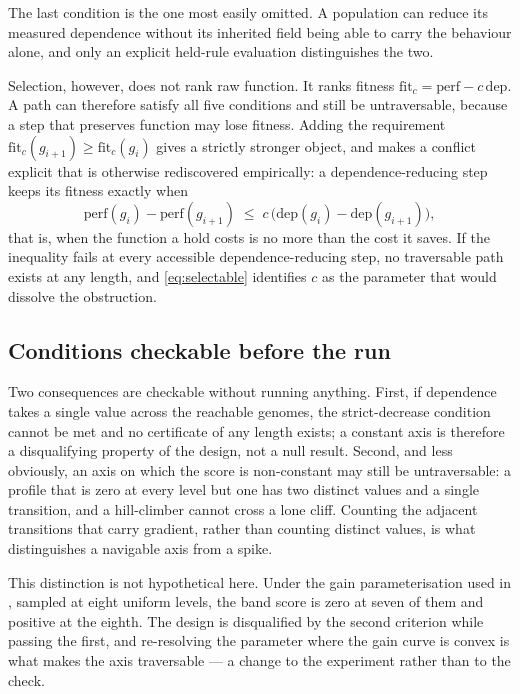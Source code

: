 \documentclass[man,12pt,floatsintext,donotrepeattitle]{apa7}
\newcommand{\secref}[1]{\emph{\nameref{#1}}}
\begin{document}
The last condition is the one most easily omitted. A population can reduce its
measured dependence without its inherited field being able to carry the behaviour
alone, and only an explicit held-rule evaluation distinguishes the two.

Selection, however, does not rank raw function. It ranks fitness
$\mathrm{fit}_c = \mathrm{perf} - c\,\mathrm{dep}$. A path can therefore satisfy
all five conditions and still be untraversable, because a step that preserves
function may lose fitness. Adding the requirement
$\mathrm{fit}_c(g_{i+1}) \ge \mathrm{fit}_c(g_i)$ gives a strictly stronger object,
and makes a conflict explicit that is otherwise rediscovered empirically: a
dependence-reducing step keeps its fitness exactly when
\begin{equation}
\mathrm{perf}(g_i) - \mathrm{perf}(g_{i+1}) \;\le\;
  c\,\bigl(\mathrm{dep}(g_i) - \mathrm{dep}(g_{i+1})\bigr),
\label{eq:selectable}
\end{equation}
that is, when the function a hold costs is no more than the cost it saves. If the
inequality fails at every accessible dependence-reducing step, no traversable path
exists at any length, and \eqref{eq:selectable} identifies $c$ as the parameter that
would dissolve the obstruction.

\subsection{Conditions checkable before the run}

Two consequences are checkable without running anything. First, if dependence takes
a single value across the reachable genomes, the strict-decrease condition cannot be
met and no certificate of any length exists; a constant axis is therefore a
disqualifying property of the design, not a null result. Second, and less obviously,
an axis on which the score is non-constant may still be untraversable: a profile that
is zero at every level but one has two distinct values and a single transition, and a
hill-climber cannot cross a lone cliff. Counting the adjacent transitions that carry
gradient, rather than counting distinct values, is what distinguishes a navigable axis
from a spike.

This distinction is not hypothetical here. Under the gain parameterisation used in
\secref{sec:endogenous-gain}, sampled at eight uniform levels, the band score is zero
at seven of them and positive at the eighth. The design is disqualified by the second
criterion while passing the first, and re-resolving the parameter where the gain curve
is convex is what makes the axis traversable --- a change to the experiment rather
than to the check.
\end{document}
